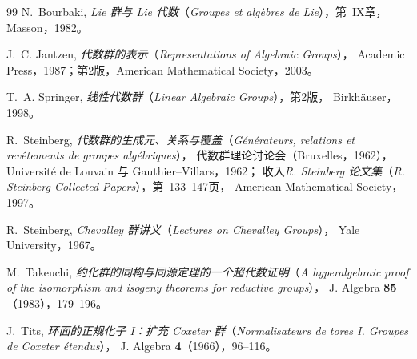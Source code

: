 \begin{thebibliography}{99}
N.~Bourbaki,
\emph{Lie 群与 Lie 代数}（\emph{Groupes et algèbres de Lie}），第~IX章，
Masson，1982。

J.~C. Jantzen,
\emph{代数群的表示}（\emph{Representations of Algebraic Groups}），
Academic Press，1987；第2版，American Mathematical Society，2003。

T.~A. Springer,
\emph{线性代数群}（\emph{Linear Algebraic Groups}），第2版，
Birkhäuser，1998。

R.~Steinberg,
\emph{代数群的生成元、关系与覆盖}（\emph{Générateurs, relations et revêtements de groupes algébriques}），
代数群理论讨论会（Bruxelles，1962），
Université de Louvain 与 Gauthier--Villars，1962；
收入\emph{R. Steinberg 论文集}（\emph{R. Steinberg Collected Papers}），第~133--147页，
American Mathematical Society，1997。

R.~Steinberg,
\emph{Chevalley 群讲义}（\emph{Lectures on Chevalley Groups}），
Yale University，1967。

M.~Takeuchi,
\emph{约化群的同构与同源定理的一个超代数证明}（\emph{A hyperalgebraic proof of the isomorphism and isogeny theorems for reductive groups}），
J. Algebra \textbf{85}（1983），179--196。

J.~Tits,
\emph{环面的正规化子 I：扩充 Coxeter 群}（\emph{Normalisateurs de tores I. Groupes de Coxeter étendus}），
J. Algebra \textbf{4}（1966），96--116。
\end{thebibliography}



